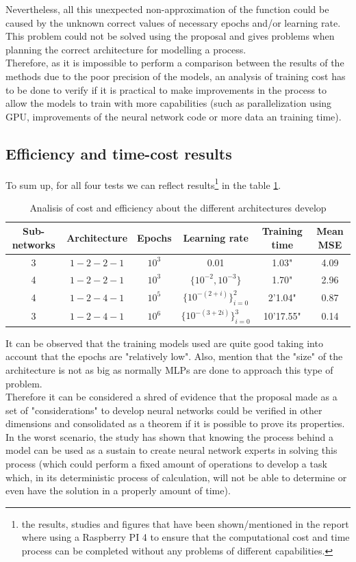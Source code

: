 \documentclass[a4paper, 11pt]{article}
\begin{document}
Nevertheless, all this unexpected non-approximation of the function could be caused by the unknown correct values of necessary epochs and/or learning rate.\\
This problem could not be solved using the proposal and gives problems when planning the correct architecture for modelling a process.\\
Therefore, as it is impossible to perform a comparison between the results of the methods due to the poor precision of the models, an analysis of training cost has to be done to verify if it is practical to make improvements in the process to allow the models to train with more capabilities (such as parallelization using GPU, improvements of the neural network code or more data an training time). 

\subsection{Efficiency and time-cost results}
To sum up, for all four tests we can reflect results\footnote{the results, studies and figures that have been shown/mentioned in the report where using a Raspberry PI 4 to ensure that the computational cost and time process can be completed without any problems of different capabilities.} in the table \ref{efficiency-table}.\\
\begin{table}[h]
    \centering
    \begin{tabular}{c|c|c|c|c|c}
 Sub-networks & Architecture & Epochs & Learning rate & Training time & Mean MSE\\\hline\hline
 3 & $1-2-2-1$ & $10^3$ & 0.01 & 1.03" & 4.09 \\\hline
 4 & $1-2-2-1$ & $10^3$ & $\{10^{-2}, 10^{-3}\}$ & 1.70" & 2.96 \\\hline
 4 & $1-2-4-1$ & $10^5$ & $\{10^{-(2+i)}\}_{i=0}^{2}$& 2'1.04" & 0.87 \\\hline
 3 & $1-2-4-1$ & $10^6$ & $\{10^{-(3+2i)}\}_{i=0}^{3}$& 10'17.55" & 0.14\\
    \end{tabular}
    \caption{Analisis of cost and efficiency about the different architectures develop}
    \label{efficiency-table}
\end{table}
It can be observed that the training models used are quite good taking into account that the epochs are "relatively low". Also, mention that the "size" of the architecture is not as big as normally MLPs are done to approach this type of problem.\\
Therefore it can be considered a shred of evidence that the proposal made as a set of "considerations" to develop neural networks could be verified in other dimensions and consolidated as a theorem if it is possible to prove its properties.\\
In the worst scenario, the study has shown that knowing the process behind a model can be used as a sustain to create neural network experts in solving this process (which could perform a fixed amount of operations to develop a task which, in its deterministic process of calculation, will not be able to determine or even have the solution in a properly amount of time).
\end{document}
